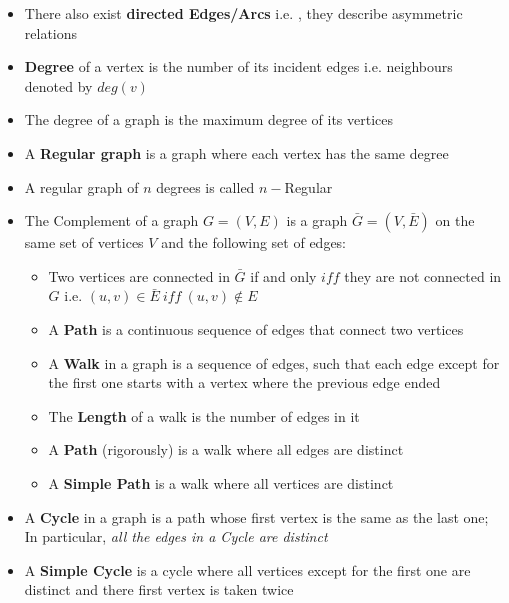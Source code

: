 \begin{itemize}
\item There also exist \textbf{directed Edges/Arcs} i.e. , they describe asymmetric relations
\item \textbf{Degree} of a vertex is the number of its incident edges i.e. neighbours denoted by $deg(v)$
\item The degree of a graph is the maximum degree of its vertices
\item A \textbf{Regular graph} is a graph where each vertex has the same degree
\item A regular graph of $n$ degrees is called $n-$Regular
\item  The Complement of a graph $G = (V, E)$ is a graph $\bar{G} = (V, \bar{E})$ on the same set of vertices $V$ and the following set of edges:
\begin{itemize}
\item Two vertices are connected in $\bar{G}$ if and only $iff$ they are not connected in $G$ i.e. $(u,v) \in \bar{E} \ iff \  (u,v) \notin E$
\item A \textbf{Path} is a continuous sequence of edges that connect two vertices
\item A \textbf{Walk} in a graph is a sequence of edges, such that each edge except for the first one starts with a vertex where the previous edge ended
\item The \textbf{Length} of a walk is the number of edges in it
\item A \textbf{Path} (rigorously) is a walk where all edges are distinct
\item A \textbf{Simple Path} is a walk where all vertices are distinct
\end{itemize}
\item  A \textbf{Cycle} in a graph is a path whose first vertex is the same as the last one; In particular, \textit{all the edges in a Cycle are
	distinct}
\item A \textbf{Simple Cycle} is a cycle where all vertices
except for the first one are distinct and
there first vertex is taken twice
\end{itemize}
